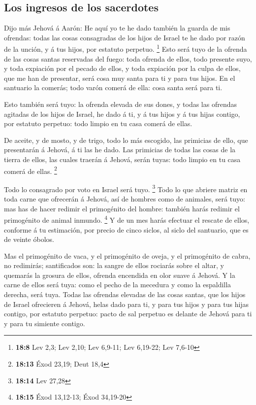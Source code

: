 \hypertarget{los-ingresos-de-los-sacerdotes}{%
\subsection{Los ingresos de los
sacerdotes}\label{los-ingresos-de-los-sacerdotes}}

 Dijo más Jehová á Aarón: He aquí yo te he dado también la
guarda de mis ofrendas: todas las cosas consagradas de los hijos de
Israel te he dado por razón de la unción, y á tus hijos, por estatuto
perpetuo. \footnote{\textbf{18:8} Lev 2,3; Lev 2,10; Lev 6,9-11; Lev
  6,19-22; Lev 7,6-10}  Esto será tuyo de la ofrenda de las
cosas santas reservadas del fuego: toda ofrenda de ellos, todo presente
suyo, y toda expiación por el pecado de ellos, y toda expiación por la
culpa de ellos, que me han de presentar, será cosa muy santa para ti y
para tus hijos.  En el santuario la comerás; todo varón
comerá de ella: cosa santa será para ti.

 Esto también será tuyo: la ofrenda elevada de sus dones, y
todas las ofrendas agitadas de los hijos de Israel, he dado á ti, y á
tus hijos y á tus hijas contigo, por estatuto perpetuo: todo limpio en
tu casa comerá de ellas.

 De aceite, y de mosto, y de trigo, todo lo más escogido,
las primicias de ello, que presentarán á Jehová, á ti las he dado.
 Las primicias de todas las cosas de la tierra de ellos,
las cuales traerán á Jehová, serán tuyas: todo limpio en tu casa comerá
de ellas. \footnote{\textbf{18:13} Éxod 23,19; Deut 18,4}

 Todo lo consagrado por voto en Israel será tuyo.
\footnote{\textbf{18:14} Lev 27,28}  Todo lo que abriere
matriz en toda carne que ofrecerán á Jehová, así de hombres como de
animales, será tuyo: mas has de hacer redimir el primogénito del hombre:
también harás redimir el primogénito de animal inmundo. \footnote{\textbf{18:15}
  Éxod 13,12-13; Éxod 34,19-20}  Y de un mes harás efectuar
el rescate de ellos, conforme á tu estimación, por precio de cinco
siclos, al siclo del santuario, que es de veinte óbolos.

 Mas el primogénito de vaca, y el primogénito de oveja, y
el primogénito de cabra, no redimirás; santificados son: la sangre de
ellos rociarás sobre el altar, y quemarás la grosura de ellos, ofrenda
encendida en olor suave á Jehová.  Y la carne de ellos será
tuya: como el pecho de la mecedura y como la espaldilla derecha, será
tuya.  Todas las ofrendas elevadas de las cosas santas, que
los hijos de Israel ofrecieren á Jehová, helas dado para ti, y para tus
hijos y para tus hijas contigo, por estatuto perpetuo: pacto de sal
perpetuo es delante de Jehová para ti y para tu simiente contigo.

